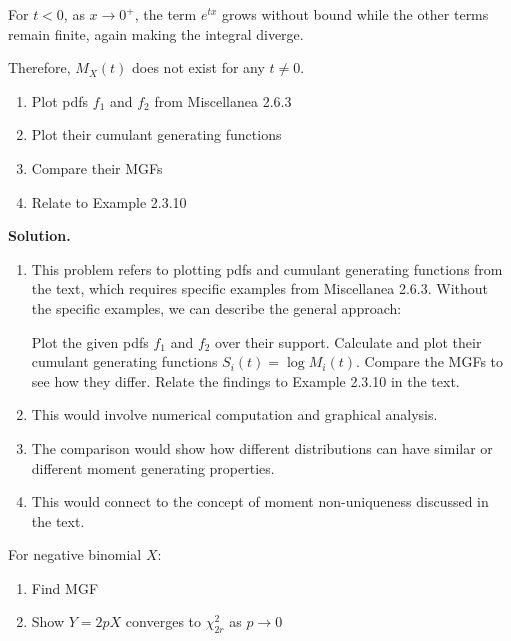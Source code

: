 For $t < 0$, as $x \to 0^+$, the term $e^{tx}$ grows without bound while the other terms remain finite, again making the integral diverge.

Therefore, $M_X(t)$ does not exist for any $t \neq 0$.

\begin{problembox}
\begin{enumerate}[label=(\alph*)]
    \item Plot pdfs $f_1$ and $f_2$ from Miscellanea 2.6.3
    \item Plot their cumulant generating functions
    \item Compare their MGFs
    \item Relate to Example 2.3.10
\end{enumerate}
\end{problembox}

\noindent\textbf{Solution.}
\begin{enumerate}[label=(\alph*)]
    \item This problem refers to plotting pdfs and cumulant generating functions from the text, which requires specific examples from Miscellanea 2.6.3. Without the specific examples, we can describe the general approach:
    
    Plot the given pdfs $f_1$ and $f_2$ over their support.
    Calculate and plot their cumulant generating functions $S_i(t) = \log M_i(t)$.
    Compare the MGFs to see how they differ.
    Relate the findings to Example 2.3.10 in the text.
    
    \item This would involve numerical computation and graphical analysis.
    
    \item The comparison would show how different distributions can have similar or different moment generating properties.
    
    \item This would connect to the concept of moment non-uniqueness discussed in the text.
\end{enumerate}

\begin{problembox}
For negative binomial $X$:
\begin{enumerate}[label=(\alph*)]
    \item Find MGF
    \item Show $Y=2pX$ converges to $\chi^2_{2r}$ as $p\to0$
\end{enumerate}
\end{problembox}

